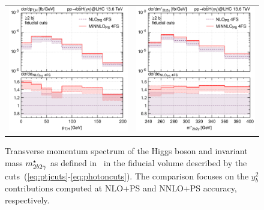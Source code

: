 \documentclass[11pt,a4paper]{article}
\begin{document}
\begin{figure}[t!]
\begin{center}
\begin{tabular}{cc}
\includegraphics[width=.45\textwidth, page=1]{plots/4fs/pt_Higgs-EXP-fid-FC.pdf}&
\includegraphics[width=.45\textwidth, page=1]{plots/4fs/mass_2b2gam-EXP-fid-FC.pdf}
\end{tabular}
\vspace*{1ex}
\caption{Transverse momentum spectrum of the Higgs boson and invariant mass $m_{2b2\gamma}^{\star}$ as defined in~ in the fiducial volume described by the cuts~(\ref{eq:ptjcuts}-\ref{eq:photoncuts}). The comparison focuses on the $y_b^2$ contributions computed at NLO+PS and NNLO+PS accuracy, respectively.\label{fig:4fsFID}}
\end{center}
\end{figure}
\end{document}
